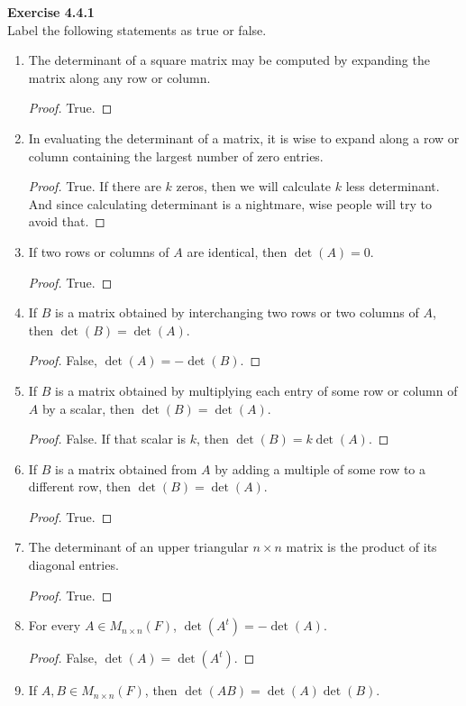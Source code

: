 \documentclass[12pt, a4paper]{article}
\theoremstyle{plain}
\newenvironment{exercise}[2][Exercise]
    { \begin{mdframed}[backgroundcolor=gray!20] \textbf{#1 #2} \\}
    {  \end{mdframed}}
\begin{document}
\begin{exercise}{4.4.1}
Label the following statements as true or false.
\begin{enumerate}[label=(\alph*)]
\item The determinant of a square matrix may be computed by expanding the matrix along any row or column.
	\begin{proof}
	True.
	\end{proof}

\item In evaluating the determinant of a matrix, it is wise to expand along a row or column containing the largest number of zero entries.
	\begin{proof}
	True. If there are $k$ zeros, then we will calculate $k$ less determinant. And since calculating determinant is a nightmare, wise people will try to avoid that.
	\end{proof}
\item If two rows or columns of $A$ are identical, then $\det(A)=0$.
	\begin{proof}
	True.
	\end{proof}
\item If $B$ is a matrix obtained by interchanging two rows or two columns of $A$, then $\det(B)=\det(A)$.
	\begin{proof}
	False, $\det(A)=-\det(B)$.
	\end{proof}
\item If $B$ is a matrix obtained by multiplying each entry of some row or column of $A$ by a scalar, then $\det(B)=\det(A)$.
	\begin{proof}
	False. If that scalar is $k$, then $\det(B)=k\det(A)$.
	\end{proof}
\item If $B$ is a matrix obtained from $A$ by adding a multiple of some row to a different row, then $\det(B)=\det(A)$.
	\begin{proof}
	True.
	\end{proof}
\item The determinant of an upper triangular $n\times n$ matrix is the product of its diagonal entries.
	\begin{proof}
	True.
	\end{proof}
\item For every $A\in M_{n\times n}(F)$, $\det(A^t)=-\det(A)$.
	\begin{proof}
	False, $\det(A)=\det(A^t)$.
	\end{proof}
\item If $A,B\in M_{n\times n}(F)$, then $\det(AB)=\det(A)\det(B)$.

\end{enumerate}
\end{exercise}
\end{document}
